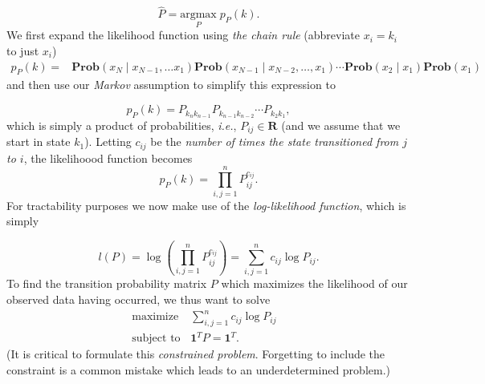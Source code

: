 \documentclass[12pt,reqno]{article}
\theoremstyle{definition}
\numberwithin{equation}{section}
\begin{document}
\[\hat{P} = \underset{P}{\mathrm{argmax}} \; p_P(k). \]
We first expand the likelihood function using \textit{the chain rule} (abbreviate $x_i = k_i$ to just $x_i$)
\[\begin{aligned}
    p_{P}(k) = & \mathbf{Prob}\left(x_N \mid x_{N-1}, \ldots x_1\right) \mathbf{Prob}\left(x_{N-1} \mid x_{N-2}, \ldots, x_1\right) \cdots \mathbf{Prob}\left(x_2 \mid x_1\right) \mathbf{Prob}\left(x_1\right)
\end{aligned}\]
and then use our \textit{Markov} assumption to simplify this expression to

\[p_{P}(k) = P_{k_{n}k_{n-1}}P_{k_{n-1}k_{n-2}} \cdots P_{k_{2}k_{1}},\]
which is simply a product of probabilities, \textit{i.e.}, $P_{ij} \in \mathbf{R}$ (and we assume
that we start in state $k_1$). Letting $c_{ij}$ be the \textit{number of times the state transitioned
from $j$ to $i$}, the likelihoood function becomes
\[p_{P}(k) = \prod_{i, j=1}^{n}P_{ij}^{c_{ij}}.\]
For tractability purposes we now make use of the \textit{log-likelihood function}, which is simply

\[l(P) = \log \left( \prod_{i, j=1}^{n}P_{ij}^{c_{ij}} \right) = \sum_{i, j=1}^{n} c_{ij}\log P_{ij}.\]
To find the transition probability matrix $P$ which maximizes the likelihood of our observed data having occurred,
we thus want to solve
\[\begin{array}{lll}
\text{maximize} \; & \sum_{i, j=1}^{n} c_{ij}\log P_{ij} & \\
\text{subject to} & \bm{1}^T P = \bm{1}^T.
\end{array}\]
(It is critical to formulate this \textit{constrained problem}. Forgetting to include the constraint
is a common mistake which leads to an underdetermined problem.)
\end{document}

